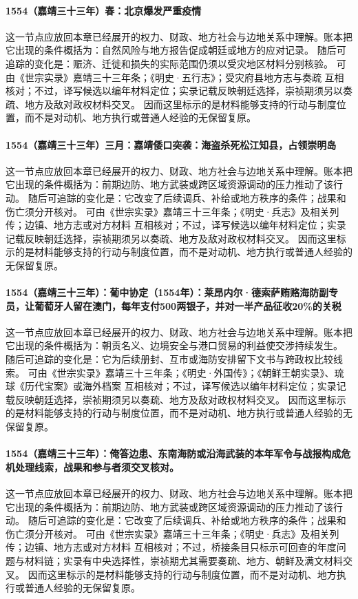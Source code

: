 \paragraph{1554（嘉靖三十三年）春：北京爆发严重疫情} 这一节点应放回本章已经展开的权力、财政、地方社会与边地关系中理解。账本把它出现的条件概括为：自然风险与地方报告促成朝廷或地方的应对记录。 随后可追踪的变化是：赈济、迁徙和损失的实际范围仍须以受灾地区材料分别核验。 可由《世宗实录》嘉靖三十三年条；《明史·五行志》；受灾府县地方志与奏疏 互相核对；不过，译写候选以编年材料定位；实录记载反映朝廷选择，崇祯期须另以奏疏、地方及敌对政权材料交叉。 因而这里标示的是材料能够支持的行动与制度位置，而不是对动机、地方执行或普通人经验的无保留复原。

\paragraph{1554（嘉靖三十三年）三月：嘉靖倭口突袭：海盗杀死松江知县，占领崇明岛} 这一节点应放回本章已经展开的权力、财政、地方社会与边地关系中理解。账本把它出现的条件概括为：前期边防、地方武装或跨区域资源调动的压力推动了该行动。 随后可追踪的变化是：它改变了后续调兵、补给或地方秩序的条件；战果和伤亡须分开核对。 可由《世宗实录》嘉靖三十三年条；《明史·兵志》及相关列传；边镇、地方志或对方材料 互相核对；不过，译写候选以编年材料定位；实录记载反映朝廷选择，崇祯期须另以奏疏、地方及敌对政权材料交叉。 因而这里标示的是材料能够支持的行动与制度位置，而不是对动机、地方执行或普通人经验的无保留复原。

\paragraph{1554（嘉靖三十三年）：葡中协定（1554年）：莱昂内尔·德索萨贿赂海防副专员，让葡萄牙人留在澳门，每年支付500两银子，并对一半产品征收20\%的关税} 这一节点应放回本章已经展开的权力、财政、地方社会与边地关系中理解。账本把它出现的条件概括为：朝贡名义、边境安全与港口贸易的利益使交涉持续发生。 随后可追踪的变化是：它为后续册封、互市或海防安排留下文书与跨政权比较线索。 可由《世宗实录》嘉靖三十三年条；《明史·外国传》；《朝鲜王朝实录》、琉球《历代宝案》或海外档案 互相核对；不过，译写候选以编年材料定位；实录记载反映朝廷选择，崇祯期须另以奏疏、地方及敌对政权材料交叉。 因而这里标示的是材料能够支持的行动与制度位置，而不是对动机、地方执行或普通人经验的无保留复原。

\paragraph{1554（嘉靖三十三年）：俺答边患、东南海防或沿海武装的本年军令与战报构成危机处理线索，战果和参与者须交叉核对。} 这一节点应放回本章已经展开的权力、财政、地方社会与边地关系中理解。账本把它出现的条件概括为：前期边防、地方武装或跨区域资源调动的压力推动了该行动。 随后可追踪的变化是：它改变了后续调兵、补给或地方秩序的条件；战果和伤亡须分开核对。 可由《世宗实录》嘉靖三十三年条；《明史·兵志》及相关列传；边镇、地方志或对方材料 互相核对；不过，桥接条目只标示可回查的年度问题与材料链；实录有中央选择性，崇祯期尤其需要奏疏、地方、朝鲜及满文材料交叉。 因而这里标示的是材料能够支持的行动与制度位置，而不是对动机、地方执行或普通人经验的无保留复原。

